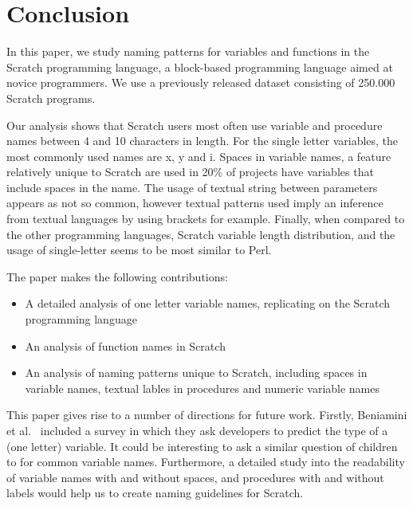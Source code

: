 \documentclass[conference]{IEEEtran}
\begin{document}
\section{Conclusion}
In this paper, we study naming patterns for variables and functions in the Scratch programming language, a block-based programming language aimed at novice programmers. We use a previously released dataset consisting of 250.000 Scratch programs. 

Our analysis shows that Scratch users most often use variable and procedure names between 4 and 10 characters in length. For the single letter variables, the most commonly used names are x, y and i. Spaces in variable names, a feature relatively unique to Scratch are used in 20\% of projects have variables that include spaces in the name. The usage of textual string between parameters appears as not so common, however textual patterns used imply an inference from textual languages by using brackets for example. Finally, when compared to the other programming languages, Scratch variable length distribution, and the usage of single-letter seems to be most similar to Perl.

The paper makes the following contributions:

\begin{itemize}
\item A detailed analysis of one letter variable names, replicating \cite{Beniamini} on the Scratch programming language
\item An analysis of function names in Scratch
\item An analysis of naming patterns unique to Scratch, including spaces in variable names, textual lables in procedures and numeric variable names
\end{itemize}

This paper gives rise to a number of directions for future work. Firstly, Beniamini et al.~\cite{Beniamini} included a survey in which they ask developers to predict the type of a (one letter) variable. It could be interesting to ask a similar question of children to for common variable names. Furthermore, a detailed study into the readability of variable names with and without spaces, and procedures with and without labels would help us to create naming guidelines for Scratch.




\end{document}
